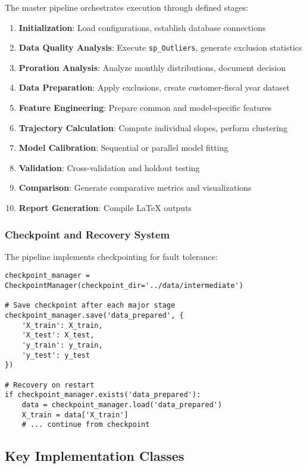 The master pipeline orchestrates execution through defined stages:

\begin{enumerate}
    \item \textbf{Initialization}: Load configurations, establish database connections
    \item \textbf{Data Quality Analysis}: Execute \texttt{sp\_Outliers}, generate exclusion statistics
    \item \textbf{Proration Analysis}: Analyze monthly distributions, document decision
    \item \textbf{Data Preparation}: Apply exclusions, create customer-fiscal year dataset
    \item \textbf{Feature Engineering}: Prepare common and model-specific features
    \item \textbf{Trajectory Calculation}: Compute individual slopes, perform clustering
    \item \textbf{Model Calibration}: Sequential or parallel model fitting
    \item \textbf{Validation}: Cross-validation and holdout testing
    \item \textbf{Comparison}: Generate comparative metrics and visualizations
    \item \textbf{Report Generation}: Compile LaTeX outputs
\end{enumerate}

\subsubsection{Checkpoint and Recovery System}

The pipeline implements checkpointing for fault tolerance:

\begin{verbatim}
checkpoint_manager = CheckpointManager(checkpoint_dir='../data/intermediate')

# Save checkpoint after each major stage
checkpoint_manager.save('data_prepared', {
    'X_train': X_train,
    'X_test': X_test,
    'y_train': y_train,
    'y_test': y_test
})

# Recovery on restart
if checkpoint_manager.exists('data_prepared'):
    data = checkpoint_manager.load('data_prepared')
    X_train = data['X_train']
    # ... continue from checkpoint
\end{verbatim}

\subsection{Key Implementation Classes}

